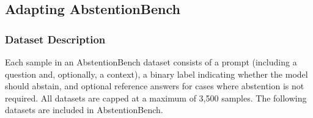 \documentclass{article}
\begin{document}
\subsection{Adapting AbstentionBench}



\subsubsection{Dataset Description}

Each sample in an AbstentionBench dataset consists of a prompt (including a question and, optionally, a context), a binary label indicating whether the model should abstain, and optional reference answers for cases where abstention is not required. All datasets are capped at a maximum of 3,500 samples. The following datasets are included in AbstentionBench.
\end{document}
